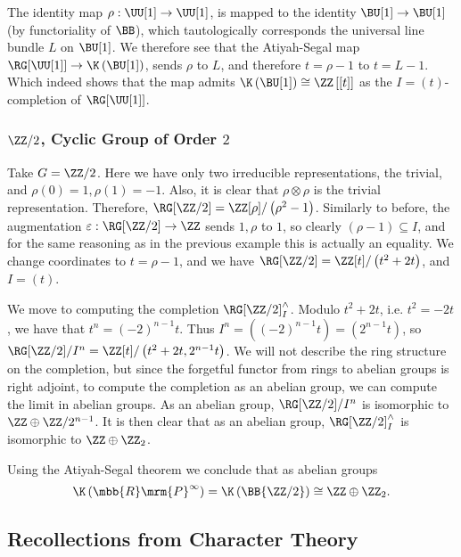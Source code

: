 The identity map $\rho: \UU[1] \to \UU[1]$, is mapped to the identity $\BU[1] \to \BU[1]$ (by functoriality of $\BB$), which tautologically corresponds the universal line bundle $L$ on $\BU[1]$.
We therefore see that the Atiyah-Segal map $\RG[\UU[1]] \to \K\left(\BU[1]\right)$, sends $\rho$ to $L$, and therefore $t = \rho - 1$ to $t = L - 1$.
Which indeed shows that the map admits $\K\left(\BU[1]\right) \cong \ZZ\left[\left[t\right]\right]$ as the $I = \left(t\right)$-completion of $\RG[\UU[1]]$.


\subsubsection{\texorpdfstring{$\ZZ/2$}{Z/2}, Cyclic Group of Order \texorpdfstring{$2$}{2}}

Take $G = \ZZ/2$.
Here we have only two irreducible representations, the trivial, and $\rho\left(0\right) = 1, \rho\left(1\right) = -1$.
Also, it is clear that $\rho \otimes \rho$ is the trivial representation.
Therefore, $\RG[\ZZ/2] = \ZZ[\rho]/\left(\rho^2-1\right)$.
Similarly to before, the augmentation $\varepsilon: \RG[\ZZ/2] \to \ZZ$ sends $1,\rho$ to $1$, so clearly $\left(\rho-1\right) \subseteq I$, and for the same reasoning as in the previous example this is actually an equality.
We change coordinates to $t = \rho-1$, and we have $\RG[\ZZ/2] = \ZZ[t]/\left(t^2+2t\right)$, and $I = \left(t\right)$.

We move to computing the completion $\RG[\ZZ/2]_I^\wedge$.
Modulo $t^2+2t$, i.e. $t^2 = -2t$, we have that $t^n = \left(-2\right)^{n-1} t$.
Thus $I^n = \left(\left(-2\right)^{n-1} t\right) = \left(2^{n-1} t\right)$, so $\RG[\ZZ/2]/I^n = \ZZ[t]/\left(t^2+2t, 2^{n-1} t\right)$.
We will not describe the ring structure on the completion, but since the forgetful functor from rings to abelian groups is right adjoint, to compute the completion as an abelian group, we can compute the limit in abelian groups.
As an abelian group, $\RG[\ZZ/2]/I^n$ is isomorphic to $\ZZ \oplus \ZZ/2^{n-1}$.
It is then clear that as an abelian group, $\RG[\ZZ/2]_I^\wedge$ is isomorphic to $\ZZ \oplus \ZZ_2$.

Using the Atiyah-Segal theorem we conclude that as abelian groups
$$
\K\left({\mbb{R}\mrm{P}}^\infty\right)
= \K\left(\BB{\ZZ/2}\right)
\cong \ZZ \oplus \ZZ_2.
$$




\subsection{Recollections from Character Theory}

